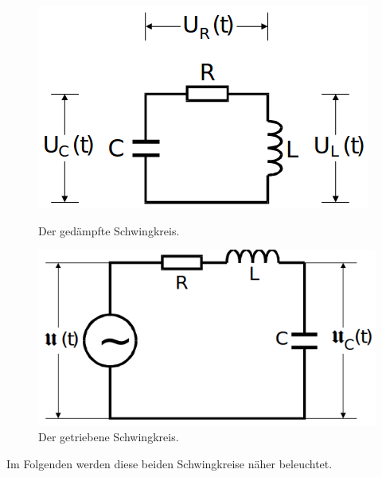 \begin{figure}[H]
    \begin{minipage}[b]{.5\linewidth} %
       \includegraphics[width=\linewidth]{pictures/gedampft.png}
       \caption{Der gedämpfte Schwingkreis. \cite{AP01}}
       \label{fig:gedampft}
    \end{minipage}
    \hspace{.1\linewidth}%
    \begin{minipage}[b]{.4\linewidth} %
       \includegraphics[width=\linewidth]{pictures/getrieben.png}
       \caption{Der getriebene Schwingkreis. \cite{AP01}}
       \label{fig:getrieben}
    \end{minipage}
  \end{figure}
\noindent
Im Folgenden werden diese beiden Schwingkreise näher beleuchtet.


